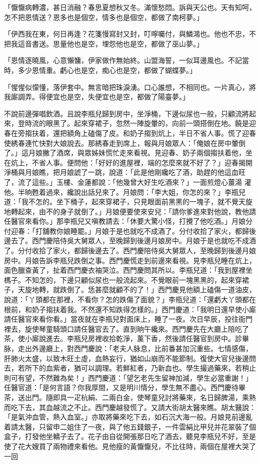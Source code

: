 \begin{showcontents}{}
「懨懨病轉濃，甚日消融？春思夏想秋又冬。滿懷愁悶。訴與天公也。天有知呵，怎不把恩情送？恩多也是個空，情多也是個空，都做了南柯夢。」

「伊西我在東，何日再逢？花箋慢寫封又封，叮嚀囑付，與鱗鴻也。他也不忠，不把我這音書送。思量他也是空，埋怨他也是空，都做了巫山夢。」

「恩情逐曉風，心意懶慵，伊家做作無始終。山盟海誓，一似耳邊風也。不記當時，多少恩情重。虧心也是空，痴心也是空，都做了蝴蝶夢。」

「惺惺似懞懂，落伊套中。無言暗把珠淚湧。口心誰想，不相同也。一片真心，將我廝調弄。得便宜也是空，失便宜也是空，都做了陽臺夢。」

不說前邊彈唱飲酒。且說李瓶兒歸到房中，坐淨桶，下邊似尿也一般，只顧流將起來，登時流的眼黑了。起來穿裙子，忽然一陣旋暈的，向前一頭搭倒在地。饒是迎春在旁搊扶着，還把額角上磕傷了皮。和奶子搊到炕上，半日不省人事。慌了迎春使綉春連忙快對大娘說去。那綉春走到席上，報與月娘眾人：「俺娘在房中暈倒了。」這月娘撇了酒席，與眾姊妹慌忙走來看視。見迎春、奶子兩個搊扶着他，坐在炕上，不省人事。便問他：「好好的進屋裡，端的怎麼來就不好了？」迎春揭開淨桶與月娘瞧，把月娘諕了一跳，說道：「此是他剛纔吃了酒，助趕的他這血旺了，流了這些。」玉樓、金蓮都說：「他幾曾大好生吃酒來？」一面煎燈心薑湯 灌他。半晌甦着過來，纔說出話兒來了。月娘問：「李大姐，你怎的來？」李瓶兒道：「我不怎的。坐下桶子，起來穿裙子，只見眼面前黑黑的一塊子，就不覺天旋地轉起來，由不的身子就倒了。」月娘便要使來安兒：「請你爹進來對他說，教他請任醫官來看你。」那李瓶兒又嗔教請去：「休要大驚小怪，打攪了他吃酒。」月娘分付迎春：「打舖教你娘睡罷。」月娘于是也就吃不成酒了。分付收拾了家火，都歸後邊去了。西門慶陪侍吳大舅眾人，至晚歸到後邊月娘房中。月娘于是也就吃不成酒了。分付收拾了家火，都歸後邊去了。西門慶陪侍吳大舅眾人，至晚歸到後邊月娘房中。月娘告訴李瓶兒跌倒之事。西門慶慌走到前邊來看視。見李瓶兒睡在炕上，面色臘查黃了，扯着西門慶衣袖哭泣。西門慶問其所以。李瓶兒道：「我到屋裡坐榪子。不知怎的，下邊只顧似尿也一般流起來。不覺眼前一塊黑黑的，起來穿裙子，天旋地轉，就跌倒了。恁甚麼就顧不的了！」西門慶見他額上磕傷一道油皮，說道：「丫頭都在那裡，不看你？怎的跌傷了面貌？」李瓶兒道：「還虧大丫頭都在根前，和奶子搊扶着我。不然還不知跌得怎樣的。」西門慶道：「我明日還早使小廝請任醫官來看你看。」當夜就在李瓶兒對面床上，睡了一夜。次日早辰，投往衙門裡去，旋使琴童騎頭口請任醫官去了。直到晌午纔來。西門慶先在大廳上陪吃了茶，使小廝說進去。李瓶兒房裡收拾乾淨，薰下香，然後請任醫官到房中。診畢脉，走出外邊廳上，對西門慶說：「老夫人脉息，比前番甚加沉重些。七情感傷，肝肺火太盛，以致木旺土虛，血熱妄行，猶如山崩而不能節制。復使大官兒後邊問去，若所下的血紫者，猶可以調理。若鮮紅者，乃新血也。學生撮過藥來，若稍止則可有望，不然難為矣！」西門慶道：「望乞老先生留神加減，學生必當重謝！」任醫官道：「是何言語？你我厚間，又是明川情分，學生無不盡心。西門慶待畢茶，送出門。隨即具一疋杭絹、二兩白金，使琴童兒討將藥來，名日歸脾湯，乘熱而吃下去，其血越流之不止。西門慶越發慌了。又請大街胡太醫來瞧。胡太醫說：「是氣沖血管，熱入血室。」亦取將藥來吃下去，如石沉大海一般。月娘見前邊亂着請太醫，只留申二姐住了一夜，與了他五錢銀子，一件雲絹比甲兒并花翠裝了個盒子，打發他坐轎子去了。花子由自從開張那日吃了酒去，聽見李瓶兒不好，至是使了花大嫂買了兩物禮來看他。見他瘦的黃懨懨兒，不比往時，兩個在屋裡大哭了一回
\end{showcontents}
